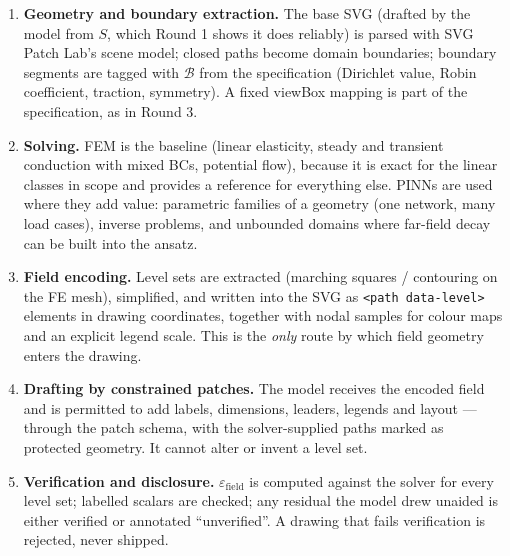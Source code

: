 \documentclass[11pt,a4paper]{article}
\newcommand{\eps}{\varepsilon_{\mathrm{field}}}
\begin{document}
\begin{enumerate}[leftmargin=2em]
  \item \textbf{Geometry and boundary extraction.} The base SVG (drafted by the model from $S$, which Round 1 shows it does reliably) is parsed with SVG Patch Lab's scene model; closed paths become domain boundaries; boundary segments are tagged with $\mathcal{B}$ from the specification (Dirichlet value, Robin coefficient, traction, symmetry). A fixed viewBox mapping is part of the specification, as in Round 3.
  \item \textbf{Solving.} FEM is the baseline (linear elasticity, steady and transient conduction with mixed BCs, potential flow), because it is exact for the linear classes in scope and provides a reference for everything else. PINNs are used where they add value: parametric families of a geometry (one network, many load cases), inverse problems, and unbounded domains where far-field decay can be built into the ansatz.
  \item \textbf{Field encoding.} Level sets are extracted (marching squares / contouring on the FE mesh), simplified, and written into the SVG as \texttt{<path data-level>} elements in drawing coordinates, together with nodal samples for colour maps and an explicit legend scale. This is the \emph{only} route by which field geometry enters the drawing.
  \item \textbf{Drafting by constrained patches.} The model receives the encoded field and is permitted to add labels, dimensions, leaders, legends and layout --- through the patch schema, with the solver-supplied paths marked as protected geometry. It cannot alter or invent a level set.
  \item \textbf{Verification and disclosure.} $\eps$ is computed against the solver for every level set; labelled scalars are checked; any residual the model drew unaided is either verified or annotated ``unverified''. A drawing that fails verification is rejected, never shipped.
\end{enumerate}
\end{document}
